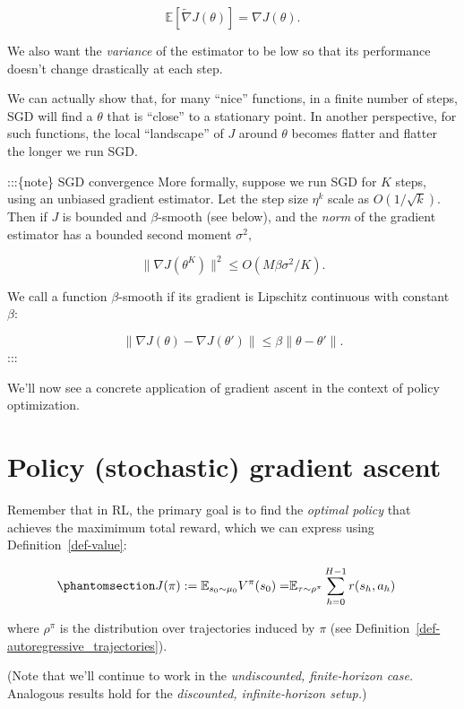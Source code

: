 \documentclass[
  letterpaper,
  DIV=11,
  numbers=noendperiod]{scrreprt}
\theoremstyle{plain}
\theoremstyle{plain}
\theoremstyle{definition}
\theoremstyle{definition}
\theoremstyle{remark}
\begin{document}
\[
\mathbb{E}[\tilde \nabla J(\theta)] = \nabla J(\theta).
\]

We also want the \emph{variance} of the estimator to be low so that its
performance doesn't change drastically at each step.

We can actually show that, for many ``nice'' functions, in a finite
number of steps, SGD will find a \(\theta\) that is ``close'' to a
stationary point. In another perspective, for such functions, the local
``landscape'' of \(J\) around \(\theta\) becomes flatter and flatter the
longer we run SGD.

:::\{note\} SGD convergence More formally, suppose we run SGD for \(K\)
steps, using an unbiased gradient estimator. Let the step size
\(\eta^k\) scale as \(O(1/\sqrt{k}).\) Then if \(J\) is bounded and
\(\beta\)-smooth (see below), and the \emph{norm} of the gradient
estimator has a bounded second moment \(\sigma^2,\)

\[\|\nabla J(\theta^K)\|^2 \le O \left( M \beta \sigma^2 / K\right).\]

We call a function \(\beta\)-smooth if its gradient is Lipschitz
continuous with constant \(\beta\):

\[\|\nabla J(\theta) - \nabla J(\theta')\| \le \beta \|\theta - \theta'\|.\]
:::

We'll now see a concrete application of gradient ascent in the context
of policy optimization.

\section{Policy (stochastic) gradient
ascent}\label{policy-stochastic-gradient-ascent}

Remember that in RL, the primary goal is to find the \emph{optimal
policy} that achieves the maximimum total reward, which we can express
using Definition~\ref{def-value}:

\begin{equation}\phantomsection\label{eq-objective_fn}{
\begin{aligned}
    J(\pi) := \mathbb{E}_{s_0 \sim \mu_0} V^{\pi} (s_0) = & \mathbb{E}_{\tau \sim \rho^\pi} \sum_{h=0}^{H-1} r(s_h, a_h)
\end{aligned}
}\end{equation}

where \(\rho^\pi\) is the distribution over trajectories induced by
\(\pi\) (see Definition~\ref{def-autoregressive_trajectories}).

(Note that we'll continue to work in the \emph{undiscounted,
finite-horizon case.} Analogous results hold for the \emph{discounted,
infinite-horizon setup.})
\end{document}
